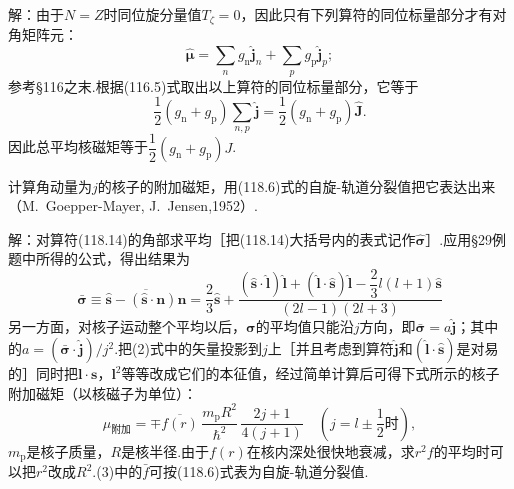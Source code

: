\begin{xiti}
解：由于$N=Z$时同位旋分量值$T_\zeta=0$，因此只有下列算符的同位标量部分才有对角矩阵元：
\begin{equation*}
  \hat{\boldsymbol{\mu}}=\sum_n g_\mathrm{n}\hat{\boldsymbol{j}}_n+\sum_p g_\mathrm{p}\hat{\boldsymbol{j}}_p;
\end{equation*}
参考§116之末.根据(116.5)式取出以上算符的同位标量部分，它等于
\begin{equation*}
  \frac{1}{2}\left(g_\mathrm{n}+g_\mathrm{p}\right)\sum_{n,p}\hat{\boldsymbol{j}}
  =\frac{1}{2}\left(g_\mathrm{n}+g_\mathrm{p}\right)\hat{\boldsymbol{J}}.
\end{equation*}
因此总平均核磁矩等于$\dfrac{1}{2}\left(g_\mathrm{n}+g_\mathrm{p}\right)J$.

\quad 计算角动量为$j$的核子的附加磁矩，用(118.6)式的自旋-轨道分裂值把它表达出来（M.~Goepper-Mayer, J.~Jensen,1952）.

解：对算符(118.14)的角部求平均［把(118.14)大括号内的表式记作$\hat{\boldsymbol{\sigma}}$］.应用§29例题中所得的公式，得出结果为
\begin{equation}
  \bar{\boldsymbol{\sigma}}\equiv\overline{\hat{\boldsymbol{s}}-(\hat{\boldsymbol{s}}\cdot\boldsymbol{n})\boldsymbol{n}}
  =\frac{2}{3}\hat{\boldsymbol{s}}
  +\frac{(\hat{\boldsymbol{s}}\cdot\hat{\boldsymbol{l}})\hat{\boldsymbol{l}}
  +(\hat{\boldsymbol{l}}\cdot\hat{\boldsymbol{s}})\hat{\boldsymbol{l}}
  -\dfrac{2}{3}l(l+1)\hat{\boldsymbol{s}}}{(2l-1)(2l+3)}
\end{equation}
另一方面，对核子运动整个平均以后，$\boldsymbol{\sigma}$的平均值只能沿$j$方向，即$\bar{\boldsymbol{\sigma}}=a\hat{\boldsymbol{j}}$；其中的$a=(\bar{\boldsymbol{\sigma}}\cdot\hat{\boldsymbol{j}})/j^2$.把(2)式中的矢量投影到$j$上［并且考虑到算符$\hat{\boldsymbol{j}}$和$(\hat{\boldsymbol{l}}\cdot\hat{\boldsymbol{s}})$是对易的］同时把$\boldsymbol{l}\cdot\boldsymbol{s}$，$\boldsymbol{l}^2$等等改成它们的本征值，经过简单计算后可得下式所示的核子附加磁矩（以核磁子为单位）：
\begin{equation}
  \mu_{\text{附加}}=\mp\overline{f(r)}\,\frac{m_\mathrm{p}R^2}{\hbar^2}\,
  \frac{2j+1}{4(j+1)}\quad\left(j=l\pm\frac{1}{2}\text{时}\right),
\end{equation}
$m_\mathrm{p}$是核子质量，$R$是核半径.由于$f(r)$在核内深处很快地衰减，求$r^2f$的平均时可以把$r^2$改成$R^2$.(3)中的$\bar{f}$可按(118.6)式表为自旋-轨道分裂值.

\end{xiti}
\renewcommand{\theequation}{\arabic{section}.\arabic{equation}}%

